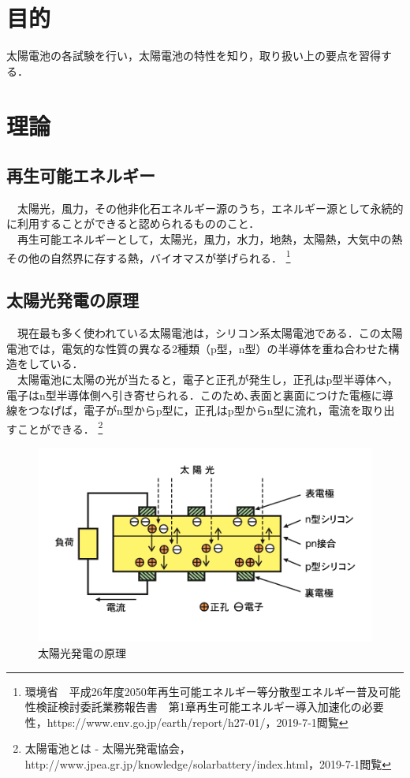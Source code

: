

\pagestyle{fancy}
\section{目的}
太陽電池の各試験を行い，太陽電池の特性を知り，取り扱い上の要点を習得する．\\

\section{理論}
\subsection{再生可能エネルギー}
　太陽光，風力，その他非化石エネルギー源のうち，エネルギー源として永続的に利用することができると認められるもののこと．\\
　再生可能エネルギーとして，太陽光，風力，水力，地熱，太陽熱，大気中の熱その他の自然界に存する熱，バイオマスが挙げられる．
\footnote{環境省　平成26年度2050年再生可能エネルギー等分散型エネルギー普及可能性検証検討委託業務報告書　第1章再生可能エネルギー導入加速化の必要性，https://www.env.go.jp/earth/report/h27-01/，2019-7-1閲覧}

\subsection{太陽光発電の原理}
　現在最も多く使われている太陽電池は，シリコン系太陽電池である．この太陽電池では，電気的な性質の異なる2種類（p型，n型）の半導体を重ね合わせた構造をしている．\\
　太陽電池に太陽の光が当たると，電子と正孔が発生し，正孔はp型半導体へ，電子はn型半導体側へ引き寄せられる．このため､表面と裏面につけた電極に導線をつなげば，電子がn型からp型に，正孔はp型からn型に流れ，電流を取り出すことができる．
\footnote{太陽電池とは - 太陽光発電協会，http://www.jpea.gr.jp/knowledge/solarbattery/index.html，2019-7-1閲覧}
\begin{figure}[H]
  \centering
  \includegraphics[width=13cm]{./fig/fig01.png}
  \caption{太陽光発電の原理}
\end{figure}

